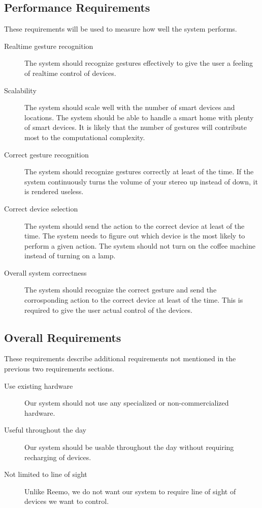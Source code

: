 \subsection{Performance Requirements}
These requirements will be used to measure how well the system performs. 
\begin{description}
    \item[Realtime gesture recognition] The system should recognize gestures effectively to give the user a feeling of realtime control of devices. %
    \item[Scalability] The system should scale well with the number of smart devices and locations. The system should be able to handle a smart home with plenty of smart devices. It is likely that the number of gestures will contribute most to the computational complexity. %
    \item[Correct gesture recognition] The system should recognize gestures correctly at least  of the time. If the system continuously turns the volume of your stereo up instead of down, it is rendered useless.  
    \item[Correct device selection] The system should send the action to the correct device at least  of the time. The system needs to figure out which device is the most likely to perform a given action. The system should not turn on the coffee machine instead of turning on a lamp.
    \item[Overall system correctness] The system should recognize the correct gesture and send the corrosponding action to the correct device at least  of the time. This is required to give the user actual control of the devices. 
\end{description}
    
\subsection{Overall Requirements}
These requirements describe additional requirements not mentioned in the previous two requirements sections.
\begin{description}
    \item[Use existing hardware] Our system should not use any specialized or non-commercialized hardware.  
    \item[Useful throughout the day] Our system should be usable throughout the day without requiring recharging of devices. 
    \item[Not limited to line of sight] Unlike Reemo, we do not want our system to require line of sight of devices we want to control. 
\end{description}
